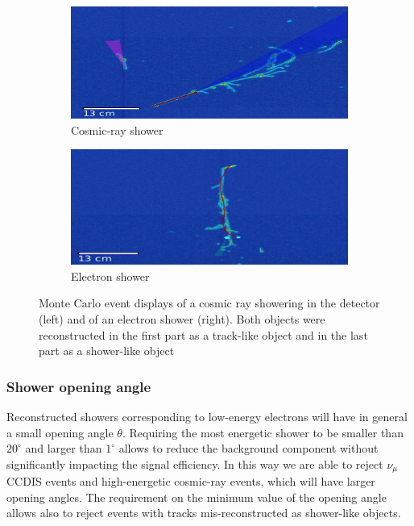 \begin{figure}[htbp]
\centering
  \begin{subfigure}{0.45\textwidth}
    \includegraphics[width=\linewidth]{figures/angle1.png}
    \caption{Cosmic-ray shower} 
  \end{subfigure}
    \begin{subfigure}{0.45\textwidth}
    \includegraphics[width=\linewidth]{figures/angle2.png}
    \caption{Electron shower} 
  \end{subfigure}
  \caption{Monte Carlo event displays of a cosmic ray showering in the detector (left) and of an electron shower (right). Both objects were reconstructed in the first part as a track-like object and in the last part as a shower-like object}\label{fig:angle}
\end{figure}


\subsubsection{Shower opening angle}
Reconstructed showers corresponding to low-energy electrons will have in general a small opening angle $\theta$. Requiring the most energetic shower to be smaller than $20^{\circ}$ and larger than $1^{\circ}$ allows to reduce the background component without significantly impacting the signal efficiency. In this way we are able to reject $\nu_{\mu}$ CCDIS events and high-energetic cosmic-ray events, which will have larger opening angles. The requirement on the minimum value of the opening angle allows also to reject events with tracks mis-reconstructed as shower-like objects.

